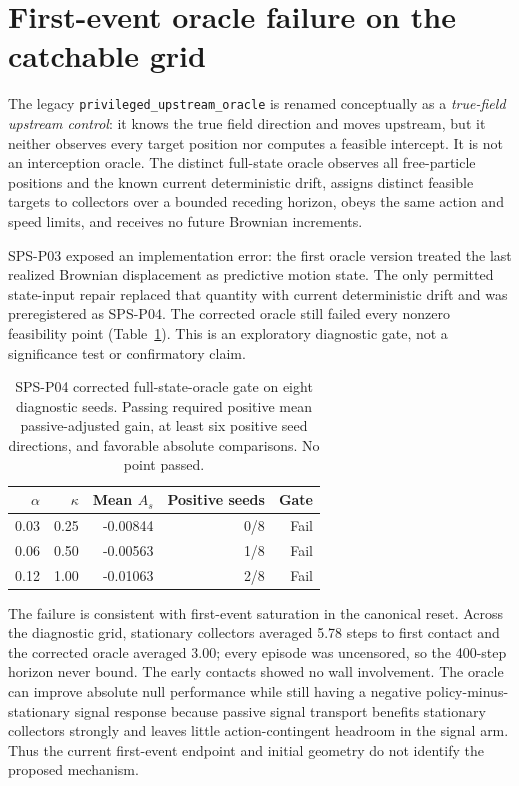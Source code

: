 \documentclass{article}
\begin{document}
\section{First-event oracle failure on the catchable grid}

The legacy \texttt{privileged\_upstream\_oracle} is renamed conceptually as a
\emph{true-field upstream control}: it knows the true field direction and moves
upstream, but it neither observes every target position nor computes a feasible
intercept. It is not an interception oracle. The distinct full-state oracle
observes all free-particle positions and the known current deterministic drift,
assigns distinct feasible targets to collectors over a bounded receding
horizon, obeys the same action and speed limits, and receives no future
Brownian increments.

SPS-P03 exposed an implementation error: the first oracle version treated the
last realized Brownian displacement as predictive motion state. The only
permitted state-input repair replaced that quantity with current deterministic
drift and was preregistered as SPS-P04. The corrected oracle still failed every
nonzero feasibility point (Table~\ref{tab:p04}). This is an exploratory
diagnostic gate, not a significance test or confirmatory claim.

\begin{table}[ht]
\centering
\caption{SPS-P04 corrected full-state-oracle gate on eight diagnostic seeds.
Passing required positive mean passive-adjusted gain, at least six positive
seed directions, and favorable absolute comparisons. No point passed.}
\label{tab:p04}
\begin{tabular}{rrrrr}
\toprule
\(\alpha\) & \(\kappa\) & Mean \(A_s\) & Positive seeds & Gate \\
\midrule
0.03 & 0.25 & -0.00844 & 0/8 & Fail \\
0.06 & 0.50 & -0.00563 & 1/8 & Fail \\
0.12 & 1.00 & -0.01063 & 2/8 & Fail \\
\bottomrule
\end{tabular}
\end{table}

The failure is consistent with first-event saturation in the canonical reset.
Across the diagnostic grid, stationary collectors averaged 5.78 steps to first
contact and the corrected oracle averaged 3.00; every episode was uncensored,
so the 400-step horizon never bound. The early contacts showed no wall
involvement. The oracle can improve absolute null performance while still having
a negative policy-minus-stationary signal response because passive signal
transport benefits stationary collectors strongly and leaves little
action-contingent headroom in the signal arm. Thus the current first-event
endpoint and initial geometry do not identify the proposed mechanism.
\end{document}
